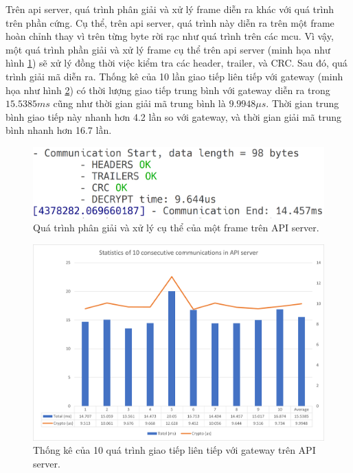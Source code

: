 Trên \acrshort{api} server, quá trình phân giải và xử lý frame diễn ra khác với quá trình trên phần cứng. Cụ thể, trên \acrshort{api} server, quá trình này diễn ra trên một frame hoàn chỉnh thay vì trên từng byte rời rạc như quá trình trên các \acrshort{mcu}. Vì vậy, một quá trình phần giải và xử lý frame cụ thể trên \acrshort{api} server (minh họa như hình \ref{fig:frame-parsing-process-api-server}) sẽ xử lý đồng thời việc kiểm tra các header, trailer, và CRC. Sau đó, quá trình giải mã diễn ra. Thống kê của 10 lần giao tiếp liên tiếp với gateway (minh họa như hình \ref{fig:10-measure-commu-server}) có thời lượng giao tiếp trung bình với gateway diễn ra trong $15.5385ms$ cũng như thời gian giải mã trung bình là $9.9948\mu s$. Thời gian trung bình giao tiếp này nhanh hơn 4.2 lần so với gateway, và thời gian giải mã trung bình nhanh hơn 16.7 lần.

\begin{figure}[htp]
\centering
\captionsetup{justification=centering}
\includegraphics[width=0.6\linewidth, frame]{images/fig-frame-parsing-process-api-server.png}
\caption{Quá trình phân giải và xử lý cụ thể của một frame trên API server.}
\label{fig:frame-parsing-process-api-server}
\end{figure}

\begin{figure}[htp]
\centering
\captionsetup{justification=centering}
\includegraphics[width=1.0\linewidth, frame]{images/fig-10-measure-commu-server.png}
\caption{Thống kê của 10 quá trình giao tiếp liên tiếp với gateway trên API server.}
\label{fig:10-measure-commu-server}
\end{figure}

